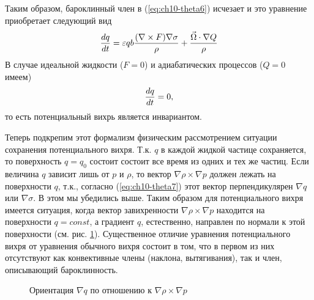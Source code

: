 Таким образом, бароклинный член в (\ref{eq:ch10-theta6}) исчезает и это уравнение приобретает следующий вид
\begin{equation}
    \label{eq:ch10-theta9}
    \displaystyle\frac{d q}{d t} = \varepsilon qb{ \frac{(\nabla\times F)\nabla\sigma}{\rho} + \frac{\vec{\Omega}\cdot\nabla Q }{\rho} }
\end{equation}
В случае идеальной жидкости ($F=0$) и адиабатических процессов ($Q=0$ имеем)
\begin{equation}
    \label{eq:ch10-theta10}
    \displaystyle\frac{d q}{d t} = 0,
\end{equation}
то есть потенциальный вихрь является инвариантом.

Теперь подкрепим этот формализм физическим рассмотрением ситуации сохранения потенциального вихря. Т.к. $q$ в каждой жидкой частице сохраняется, то поверхность $q=q_0$ состоит состоит все время из одних и тех же частиц. Если величина $q$ зависит лишь от $p$ и $\rho$, то вектор $\nabla\rho\times\nabla p$ должен лежать на поверхности $q$, т.к., согласно (\ref{eq:ch10-theta7}) этот вектор перпендикулярен $\nabla q$ или $\nabla\sigma$. В этом мы убедились выше. Таким образом для потенциального вихря имеется ситуация, когда вектор завихренности $\nabla\rho\times\nabla p$ находится на поверхности $q=const$, а градиент $q$, естественно, направлен по нормали к этой поверхности (см. рис. \ref{fig:ch10.4}). Существенное отличие уравнения потенциального вихря от уравнения обычного вихря состоит в том, что в первом из них отсутствуют как конвективные члены (наклона, вытягивания), так и член, описывающий бароклинность. 

\begin{figure}[h]
\centering
{}
\caption{\label{fig:ch10.4}Ориентация $\nabla q$ по отношению к $\nabla\rho\times\nabla p$}
\end{figure}    

